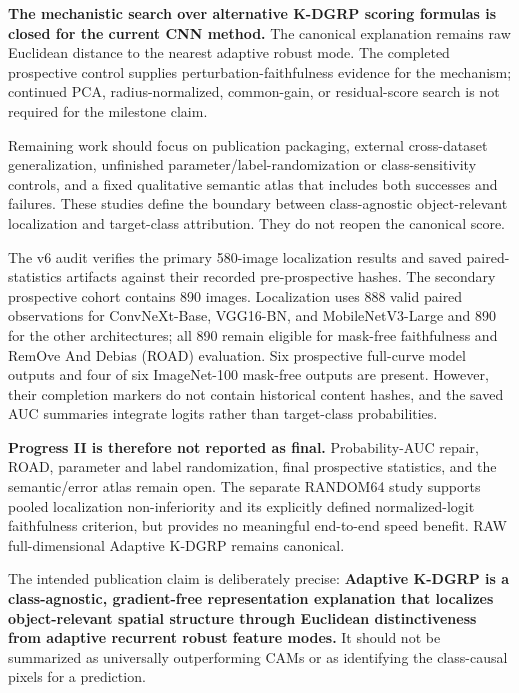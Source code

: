 \textbf{The mechanistic search over alternative K-DGRP scoring formulas is
closed for the current CNN method.} The canonical explanation remains raw
Euclidean distance to the nearest adaptive robust mode. The completed
prospective control supplies perturbation-faithfulness evidence for the
mechanism; continued PCA, radius-normalized, common-gain, or residual-score
search is not required for the milestone claim.

Remaining work should focus on publication packaging, external cross-dataset
generalization, unfinished parameter/label-randomization or class-sensitivity
controls, and a fixed qualitative semantic atlas that includes both successes
and failures. These studies define the boundary between class-agnostic
object-relevant localization and target-class attribution. They do not reopen
the canonical score.

The v6 audit verifies the primary 580-image localization results and saved
paired-statistics artifacts against their recorded pre-prospective hashes. The
secondary prospective cohort contains 890 images. Localization uses 888 valid
paired observations for ConvNeXt-Base, VGG16-BN, and MobileNetV3-Large and 890
for the other architectures; all 890 remain eligible for mask-free
faithfulness and RemOve And Debias (ROAD) evaluation. Six prospective
full-curve model outputs and four of six ImageNet-100 mask-free outputs are
present. However, their completion markers do not contain historical content
hashes, and the saved AUC summaries integrate logits rather than target-class
probabilities.

\textbf{Progress II is therefore not reported as final.} Probability-AUC
repair, ROAD, parameter and label randomization, final prospective statistics,
and the semantic/error atlas remain open. The separate RANDOM64 study supports
pooled localization non-inferiority and its explicitly defined normalized-logit
faithfulness criterion, but provides no meaningful end-to-end speed benefit.
RAW full-dimensional Adaptive K-DGRP remains canonical.

The intended publication claim is deliberately precise:
\textbf{Adaptive K-DGRP is a class-agnostic, gradient-free representation
explanation that localizes object-relevant spatial structure through Euclidean
distinctiveness from adaptive recurrent robust feature modes.} It should not be
summarized as universally outperforming CAMs or as identifying the class-causal
pixels for a prediction.
